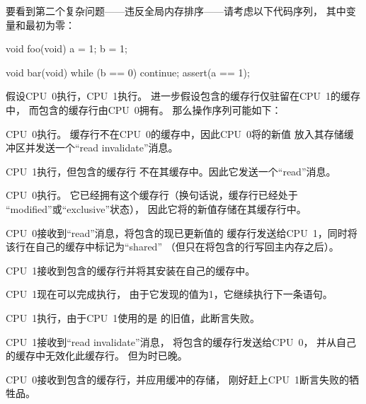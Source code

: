 要看到第二个复杂问题——违反全局内存排序——请考虑以下代码序列，
其中变量和最初为零：

\begin{VerbatimN}[fontsize=\footnotesize,samepage=true]
void foo(void)
{
	a = 1;
	b = 1;
}

void bar(void)
{
	while (b == 0) continue;
	assert(a == 1);
}
\end{VerbatimN}

假设CPU~0执行，CPU~1执行。
进一步假设包含的缓存行仅驻留在CPU~1的缓存中，
而包含的缓存行由CPU~0拥有。
那么操作序列可能如下：
\begin{sequence}
\item	CPU~0执行。
	缓存行不在CPU~0的缓存中，因此CPU~0将的新值
	放入其存储缓冲区并发送一个``read invalidate''消息。
	\label{seq:app:whymb:Store Buffers and Memory Barriers}
\item	CPU~1执行，但包含的缓存行
	不在其缓存中。因此它发送一个``read''消息。
\item	CPU~0执行。
	它已经拥有这个缓存行（换句话说，缓存行已经处于
	``modified''或``exclusive''状态），
	因此它将的新值存储在其缓存行中。
\item	CPU~0接收到``read''消息，将包含的现已更新值的
	缓存行发送给CPU~1，同时将该行在自己的缓存中标记为``shared''
	（但只在将包含的行写回主内存之后）。
	\label{seq:app:whymb:Store Buffers and Memory Barriers store}
\item	CPU~1接收到包含的缓存行并将其安装在自己的缓存中。
\item	CPU~1现在可以完成执行，
	由于它发现的值为1，它继续执行下一条语句。
\item	CPU~1执行，由于CPU~1使用的是
	的旧值，此断言失败。
\item	CPU~1接收到``read invalidate''消息，
	将包含的缓存行发送给CPU~0，
	并从自己的缓存中无效化此缓存行。
	但为时已晚。
\item	CPU~0接收到包含的缓存行，并应用缓冲的存储，
	刚好赶上CPU~1断言失败的牺牲品。
	\label{seq:app:whymb:Store Buffers and Memory Barriers victim}
\end{sequence}

\EQuickQuizEnd

